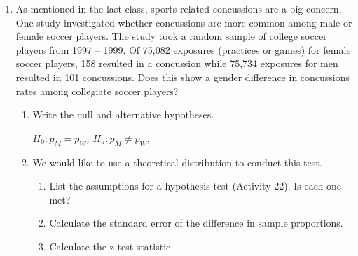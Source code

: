 \begin{enumerate}
\begin{enumerate}
         \end{enumerate}
       \item As mentioned in the last class, sports related
         concussions are a big concern.    One study
         investigated whether concussions are more common among male
         or female soccer players.  The study took a random sample of
         college soccer players from 1997 – 1999.  Of 75,082 exposures
         (practices or games) for female soccer players, 158 resulted
         in a concussion while 75,734 exposures for men resulted in
         101 concussions.  Does this show a gender difference in
         concussions rates among collegiate soccer players?  
         \begin{enumerate}
         \item  Write the null and alternative hypotheses. 
\begin{students}
          \vspace{2cm}
\end{students}
\begin{key}
 {\it  $H_0: p_M = p_W$,   $H_a: p_M \neq p_W$,  }      
\end{key}

         \item  We would like to use a theoretical distribution to
           conduct this  test. 
          \begin{enumerate}
           \item List the  assumptions for a hypothesis test
             (Activity 22).  Is  each one met?  
\begin{students}
          \vspace{3cm}
\end{students}
\begin{key}
 {\it  }      
\end{key}
           \item  Calculate the standard error of the difference in
             sample proportions. 
\begin{students}
          \vspace{1cm}
\end{students}
\begin{key}
 {\it  }      
\end{key}
           \item  Calculate the z test statistic.
\begin{students}
          \vspace{1.52cm}
\end{students}
\begin{key}
 {\it  }      
\end{key}


\end{enumerate}
\end{enumerate}
\end{enumerate}
